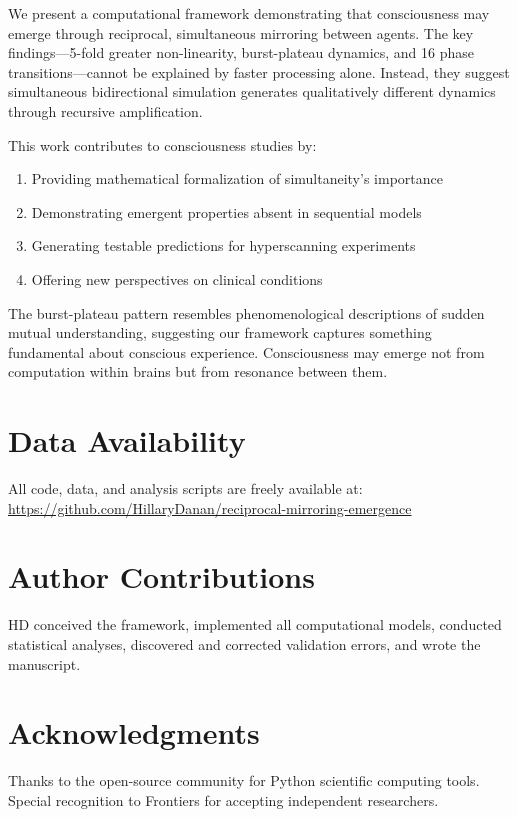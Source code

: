 \documentclass[12pt]{article}
\begin{document}
We present a computational framework demonstrating that consciousness may emerge through reciprocal, simultaneous mirroring between agents. The key findings—5-fold greater non-linearity, burst-plateau dynamics, and 16 phase transitions—cannot be explained by faster processing alone. Instead, they suggest simultaneous bidirectional simulation generates qualitatively different dynamics through recursive amplification.

This work contributes to consciousness studies by:
\begin{enumerate}
\item Providing mathematical formalization of simultaneity's importance
\item Demonstrating emergent properties absent in sequential models
\item Generating testable predictions for hyperscanning experiments
\item Offering new perspectives on clinical conditions
\end{enumerate}

The burst-plateau pattern resembles phenomenological descriptions of sudden mutual understanding, suggesting our framework captures something fundamental about conscious experience. Consciousness may emerge not from computation within brains but from resonance between them.

\section*{Data Availability}

All code, data, and analysis scripts are freely available at: \url{https://github.com/HillaryDanan/reciprocal-mirroring-emergence}

\section*{Author Contributions}

HD conceived the framework, implemented all computational models, conducted statistical analyses, discovered and corrected validation errors, and wrote the manuscript.

\section*{Acknowledgments}

Thanks to the open-source community for Python scientific computing tools. Special recognition to Frontiers for accepting independent researchers.
\end{document}
